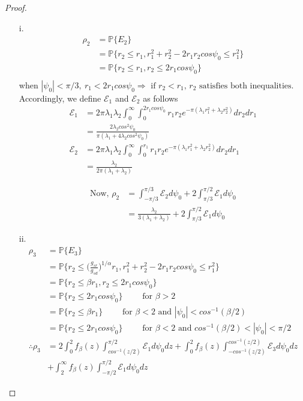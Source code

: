 \documentclass[titlepage]{article}
\begin{document}
\begin{proof}
\begin{itemize}
\item[i.] 
\begin{align*}
\rho_2 &= \mathbb{P}\{E_2\} \\
&= \mathbb{P}\{r_2 \leq r_1, r_1^2+r_2^2-2r_1r_2cos\psi_0 \leq r_1^2\} \\
&= \mathbb{P}\{r_2 \leq r_1, r_2 \leq 2 r_1 cos\psi_0 \} \\
\end{align*}
when $|\psi_0|<\pi/3, ~ r_1 < 2r_1cos\psi_0  \Rightarrow \text{ if } r_2 < r_1 \text{, $r_2$ satisfies both inequalities.}$ Accordingly, we define $\mathcal{E}_1$ and $\mathcal{E}_2$ as follows
\begin{align*}
\mathcal{E}_1 &= 2\pi\lambda_1 \lambda_2 \int_0^\infty \int_0^{2r_1 cos\psi_0}r_1r_2e^{-\pi(\lambda_1 r_1^2 + \lambda_2 r_2^2)}dr_2 dr_1 \\
&= \frac{2\lambda_2 cos^2\psi_0}{\pi(\lambda_1+4\lambda_2cos^2\psi_0)} \\
\mathcal{E}_2 &= 2\pi\lambda_1 \lambda_2 \int_0^\infty \int_0^{r_1}r_1r_2e^{-\pi(\lambda_1 r_1^2 + \lambda_2 r_2^2)}dr_2 dr_1 \\
&= \frac{\lambda_2}{2\pi(\lambda_1+\lambda_2)}
\end{align*}
 
\begin{align*}
\text{Now, }\rho_2 &= \int_{-\pi/3}^{\pi/3} \mathcal{E}_2 d\psi_0 + 2\int_{\pi/3}^{\pi/2} \mathcal{E}_1d\psi_0 \\
&=  \frac{\lambda_2}{3(\lambda_1+\lambda_2)} + 2\int_{\pi/3}^{\pi/2} \mathcal{E}_1d\psi_0
\end{align*} 

\item[ii.]
\begin{align*}
\rho_3 &= \mathbb{P}\{E_3\} \\
&= \mathbb{P}\{r_2 \leq \bigg(\frac{g_{sr}}{g_{sd}} \bigg)^{1/\alpha}r_1, r_1^2+r_2^2-2r_1r_2cos\psi_0 \leq r_1^2\} \\
&= \mathbb{P}\{r_2 \leq \beta r_1, r_2 \leq 2 r_1 cos\psi_0 \} \\
&= \mathbb{P}\{r_2 \leq 2 r_1 cos\psi_0 \} \qquad \text{ for } \beta > 2 \\
&= \mathbb{P}\{r_2 \leq \beta r_1\} \qquad \text{ for } \beta < 2  \text{ and } |\psi_0| < cos^{-1}(\beta/2) \\
&= \mathbb{P}\{r_2 \leq 2 r_1 cos\psi_0 \} \qquad \text{ for } \beta < 2 \text{ and } cos^{-1}(\beta/2) < |\psi_0| <  \pi/2 \\
\therefore \rho_3&= 2 \int_0^2 f_{\beta}(z)\int^{\pi/2}_{cos^{-1}(z/2)}\mathcal{E}_1 d\psi_0 dz +\int_0^2 f_{\beta}(z)\int_{-cos^{-1}(z/2)}^{cos^{-1}(z/2)}\mathcal{E}_3 d\psi_0dz \\&+ \int_2^{\infty} f_{\beta}(z)\int_{-\pi/2}^{\pi/2}\mathcal{E}_1 d\psi_0 dz
\end{align*}


\end{itemize}
\end{proof}
\end{document}
